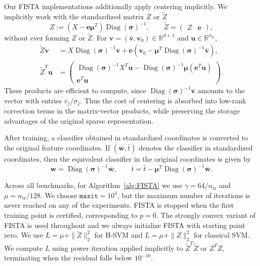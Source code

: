 \documentclass[twoside,11pt]{article}
\newcommand{\bmu}{\bm{\mu}}
\newcommand{\R}{{\mathbb{R}}} %
\renewcommand\u{\bm{u}}
\renewcommand\v{\bm{v}}
\newcommand\w{\bm{w}}
\newcommand{\Diag}{\mathop{\mathrm{Diag}}}
\newcommand\e{\bm{e}}
\newcommand\bsigma{\bm{\sigma}}
\begin{document}
Our FISTA implementations additionally apply centering implicitly. We implicitly work with the standardized matrix $Z$ or $\tilde{Z}$
\[
    Z := (X-\e\bmu^T)\Diag(\bsigma)^{-1},\qquad \tilde{Z} = \begin{pmatrix}Z & \e\end{pmatrix},
\]
without ever forming $Z$ or $\tilde{Z}$. For $\v = (\bar{\v},\v_0) \in \R^{d+1}$ and $\u \in \R^{n_{\mathrm{tr}}}$,
\begin{align*}
    \tilde{Z}\v &= X\Diag(\bsigma)^{-1}\bar{\v} + \e\left(\v_0 - \bmu^T\Diag(\bsigma)^{-1}\bar{\v}\right),\\
    \tilde{Z}^T\u &= \begin{pmatrix}\Diag(\bsigma)^{-1}X^T\u - \Diag(\bsigma)^{-1}\bmu(\e^T\u)\\
    \e^T\u
    \end{pmatrix}.
\end{align*}
These products are efficient to compute, since $\Diag(\bsigma)^{-1}\bar{\v}$ amounts to the vector with entries $\bar{v}_j/\sigma_j$. Thus the cost of centering is absorbed into low-rank correction terms in the matrix-vector products, while preserving the storage advantages of the original sparse representation.

After training, a classifier obtained in standardized coordinates is converted to the original feature coordinates. If $(\bar{\w},\bar{t})$ denotes the classifier in standardized coordinates, then the equivalent classifier in the original coordinates is given by
\[
    \w = \Diag(\bsigma)^{-1}\bar{\w}, \qquad t = \bar{t} - \bmu^T\Diag(\bsigma)^{-1}\bar{\w}.
\]

Across all benchmarks, for Algorithm~\ref{alg:FISTA} we use $\gamma = 64/{n_{\text{tr}}}$ and $\mu = n_{\text{tr}}/128$. We choose $\texttt{maxit} = 10^4$, but the maximum number of iterations is never reached on any of the experiments. FISTA is stopped when the first training point is certified, corresponding to $p=0$. The strongly convex variant of FISTA \cite[Section~10.7.7]{Beck2017} is used throughout and we always initialize FISTA with starting point zero. We use $L = \mu + \|\tilde{Z}\|_2^2$ for H-SVM and $L = \mu + \|Z\|_2^2$ for classical SVM. We compute $L$ using power iteration applied implicitly to $\tilde{Z}^T\tilde{Z}$ or $Z^TZ$, terminating when the residual falls below $10^{-10}$.
\end{document}

